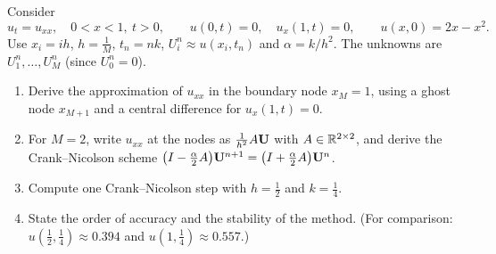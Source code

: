 Consider
\[
u_t=u_{xx},\quad 0<x<1,\ t>0,\qquad u(0,t)=0,\quad u_x(1,t)=0,\qquad u(x,0)=2x-x^2.
\]
Use $x_i=ih$, $h=\frac1M$, $t_n=nk$, $U_i^n\approx u(x_i,t_n)$ and $\alpha=k/h^2$. The unknowns are $U_1^n,\dots,U_M^n$ (since $U_0^n=0$).
\begin{enumerate}
\item Derive the approximation of $u_{xx}$ in the boundary node $x_M=1$, using a ghost node $x_{M+1}$ and a central difference for $u_x(1,t)=0$.
\item For $M=2$, write $u_{xx}$ at the nodes as $\frac1{h^2}A\mathbf{U}$ with $A\in\mathbb{R}^{2\times2}$, and derive the Crank--Nicolson scheme $\big(I-\frac\alpha2A\big)\mathbf{U}^{n+1}=\big(I+\frac\alpha2A\big)\mathbf{U}^n$.
\item Compute one Crank--Nicolson step with $h=\frac12$ and $k=\frac14$.
\item State the order of accuracy and the stability of the method. (For comparison: $u(\frac12,\frac14)\approx0.394$ and $u(1,\frac14)\approx0.557$.)
\end{enumerate}

